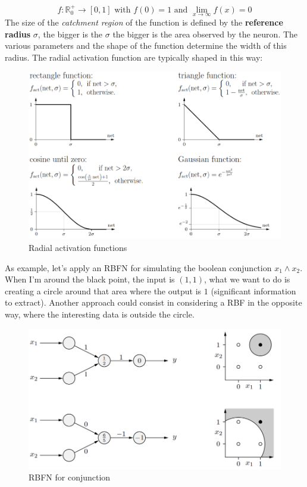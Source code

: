 \documentclass{article}
\begin{document}
$$f:\mathbb{R}_0^+\rightarrow[0,1]\text{ with }f(0)=1\text{ and }\lim_{x\rightarrow\infty}f(x)=0$$
The size of the \textit{catchment region} of the function is defined by
the \textbf{reference radius} $\sigma$, the bigger is the $\sigma$ the bigger
is the area observed by the neuron. The various parameters and the shape of the function
determine the width of this radius. The radial activation function are typically shaped in this way:
\begin{figure}[H]
    \centering
    \includegraphics[scale=0.4]{images/radial_functions.png}
    \caption{Radial activation functions}
\end{figure}
As example, let's apply an RBFN for simulating the boolean conjunction $x_1\land x_2$.
When I'm around the black point, the input is $(1,1)$, what we want to do is creating a circle
around that area where the output is $1$ (significant information to extract).
\newline\newline
Another approach could consist in considering a RBF in the opposite way, where the interesting
data is outside the circle.
\begin{figure}[H]
    \centering
    \includegraphics[scale=0.5]{images/RBFN.png}
    \caption{RBFN for conjunction}
\end{figure}
\end{document}

